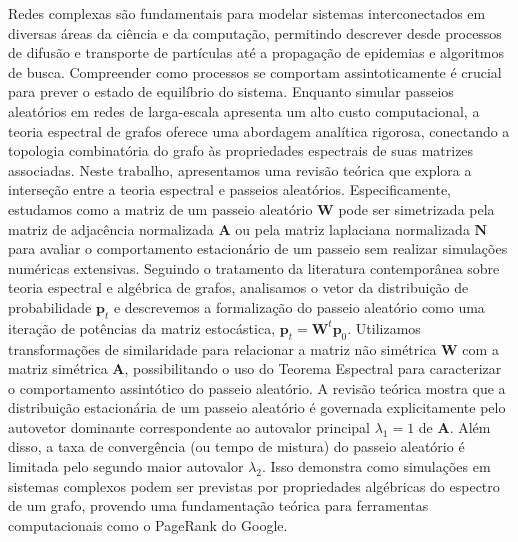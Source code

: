 \documentclass[11pt]{article}
\begin{document}
    Redes complexas são fundamentais para modelar sistemas interconectados em diversas áreas da ciência e da computação, permitindo descrever desde processos de difusão e transporte de partículas até a propagação de epidemias e algoritmos de busca. Compreender como processos se comportam assintoticamente é crucial para prever o estado de equilíbrio do sistema. Enquanto simular passeios aleatórios em redes de larga-escala apresenta um alto custo computacional, a teoria espectral de grafos oferece uma abordagem analítica rigorosa, conectando a topologia combinatória do grafo às propriedades espectrais de suas matrizes associadas.
    Neste trabalho, apresentamos uma revisão teórica que explora a interseção entre a teoria espectral e passeios aleatórios. Especificamente, estudamos como a matriz de um passeio aleatório \(\mathbf{W}\) pode ser simetrizada pela matriz de adjacência normalizada \(\mathbf{A}\) ou pela matriz laplaciana normalizada \(\mathbf{N}\) para avaliar o comportamento estacionário de um passeio sem realizar simulações numéricas extensivas.
    Seguindo o tratamento da literatura contemporânea sobre teoria espectral e algébrica de grafos, analisamos o vetor da distribuição de probabilidade \(\mathbf{p}_t\) e descrevemos a formalização do passeio aleatório como uma iteração de potências da matriz estocástica, \(\mathbf{p}_t = \mathbf{W}^t \mathbf{p}_0\). Utilizamos transformações de similaridade para relacionar a matriz não simétrica \(\mathbf{W}\) com a matriz simétrica \(\mathbf{A}\), possibilitando o uso do Teorema Espectral para caracterizar o comportamento assintótico do passeio aleatório.
    A revisão teórica mostra que a distribuição estacionária de um passeio aleatório é governada explicitamente pelo autovetor dominante correspondente ao autovalor principal \(\lambda_1 = 1\) de \(\mathbf{A}\). Além disso, a taxa de convergência (ou tempo de mistura) do passeio aleatório é limitada pelo segundo maior autovalor \(\lambda_2\). Isso demonstra como simulações em sistemas complexos podem ser previstas por propriedades algébricas do espectro de um grafo, provendo uma fundamentação teórica para ferramentas computacionais como o PageRank do Google.
\end{document}
